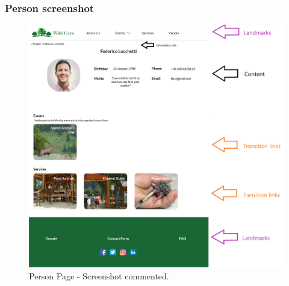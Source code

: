 \subsubsection{Person screenshot}
\begin{figure}[h!]
	\centering
	\begin{minipage}[b]{1\textwidth}
    		\includegraphics[width=\textwidth]{./assets/mockups/persondetails_commented.png}
		\caption{Person Page - Screenshot commented.}
	\end{minipage}
\end{figure}
\FloatBarrier
